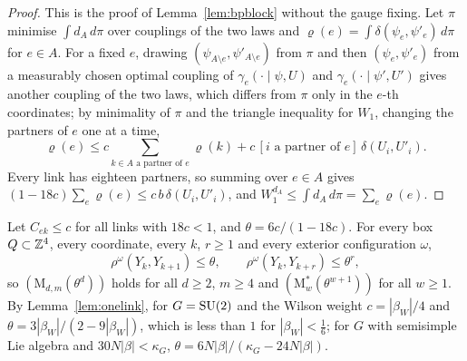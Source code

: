 \begin{proof}
This is the proof of Lemma~\ref{lem:bpblock} without the gauge fixing. Let
$\pi$ minimise $\int d_A\,d\pi$ over couplings of the two laws and
$\varrho(e)=\int\delta(\psi_e,\psi'_e)\,d\pi$ for $e\in A$. For a fixed $e$,
drawing $(\psi_{A\setminus e},\psi'_{A\setminus e})$ from $\pi$ and then
$(\psi_e,\psi'_e)$ from a measurably chosen optimal coupling of
$\gamma_e(\cdot\mid\psi,U)$ and $\gamma_e(\cdot\mid\psi',U')$
\cite[Cor.~5.22]{Vil09} gives another coupling of the two laws, which
differs from $\pi$ only in the $e$-th coordinates; by minimality of $\pi$
and the triangle inequality for $W_1$, changing the partners of $e$ one at
a time,
\[
\varrho(e)\le c\sum_{k\in A\text{ a partner of }e}\varrho(k)+c\,[i\text{ a
partner of }e]\,\delta(U_i,U'_i).
\]
Every link has eighteen partners, so summing over $e\in A$ gives
$(1-18c)\sum_e\varrho(e)\le c\,b\,\delta(U_i,U'_i)$, and $W_1^{d_A}\le\int
d_A\,d\pi=\sum_e\varrho(e)$.
\end{proof}

\begin{proposition}\label{prop:layersstrong}
Let $C_{ek}\le c$ for all links with $18c<1$, and $\theta=6c/(1-18c)$. For
every box $Q\subset\mathbb{Z}^4$, every coordinate, every $k$, $r\ge1$ and every
exterior configuration $\omega$,
\[
\rho^\omega(Y_k,Y_{k+1})\le\theta,\qquad\rho^\omega(Y_k,Y_{k+r})\le\theta^r,
\]
so $(\mathrm M_{d,m}(\theta^d))$ holds for all $d\ge2$, $m\ge4$ and
$(\mathrm M^*_w(\theta^{w+1}))$ for all $w\ge1$. By
Lemma~\textup{\ref{lem:onelink}}, for $G=\mathrm{SU}(2)$ and the Wilson weight
$c=|\beta_W|/4$ and $\theta=3|\beta_W|/(2-9|\beta_W|)$, which is less than
$1$ for $|\beta_W|<\frac16$; for $G$ with semisimple Lie algebra and
$30N|\beta|<\kappa_G$, $\theta=6N|\beta|/(\kappa_G-24N|\beta|)$.
\end{proposition}

